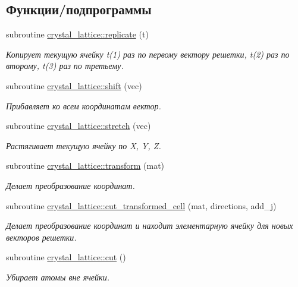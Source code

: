 \subsection*{Функции/подпрограммы}
\begin{DoxyCompactItemize}
\item 
subroutine \mbox{\hyperlink{namespacecrystal__lattice_ae3ea349cd216cd0f31efdd2d84704007}{crystal\+\_\+lattice\+::replicate}} (t)
\begin{DoxyCompactList}\small\item\em Копирует текущую ячейку t(1) раз по первому вектору решетки, t(2) раз по второму, t(3) раз по третьему. \end{DoxyCompactList}\item 
subroutine \mbox{\hyperlink{namespacecrystal__lattice_a1591b9c034e98c3a8969210257581db5}{crystal\+\_\+lattice\+::shift}} (vec)
\begin{DoxyCompactList}\small\item\em Прибавляет ко всем координатам вектор. \end{DoxyCompactList}\item 
subroutine \mbox{\hyperlink{namespacecrystal__lattice_ad78cba30d21fa9e157b11564b881f8cd}{crystal\+\_\+lattice\+::stretch}} (vec)
\begin{DoxyCompactList}\small\item\em Растягивает текущую ячейку по X, Y, Z. \end{DoxyCompactList}\item 
subroutine \mbox{\hyperlink{namespacecrystal__lattice_a77b85f0b416c4a11dced3be62042df24}{crystal\+\_\+lattice\+::transform}} (mat)
\begin{DoxyCompactList}\small\item\em Делает преобразование координат. \end{DoxyCompactList}\item 
subroutine \mbox{\hyperlink{namespacecrystal__lattice_a4521a112e9b35e44f528934fe2a532f1}{crystal\+\_\+lattice\+::cut\+\_\+transformed\+\_\+cell}} (mat, directions, add\+\_\+j)
\begin{DoxyCompactList}\small\item\em Делает преобразование координат и находит элементарную ячейку для новых векторов решетки. \end{DoxyCompactList}\item 
subroutine \mbox{\hyperlink{namespacecrystal__lattice_ab23b4fedfcb48100b0fff538f200635b}{crystal\+\_\+lattice\+::cut}} ()
\begin{DoxyCompactList}\small\item\em Убирает атомы вне ячейки. \end{DoxyCompactList}\item 

\end{DoxyCompactItemize}
